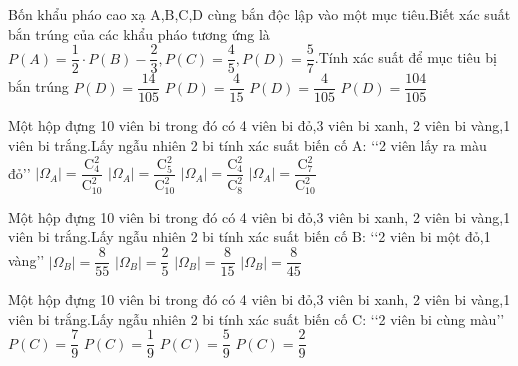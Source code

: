 \begin{ex}
Bốn khẩu pháo cao xạ A,B,C,D cùng bắn độc lập vào một mục tiêu.Biết xác suất bắn trúng của các khẩu pháo tương ứng là $P(A)=\dfrac{1}{2}\cdot P(B)-\dfrac{2}{3},P(C)=\dfrac{4}{5},P(D)=\dfrac{5}{7}$.Tính xác suất để mục tiêu bị bắn trúng
\choice
{$P(D)=\dfrac{14}{105}$}
{$P(D)=\dfrac{4}{15}$}
{$P(D)=\dfrac{4}{105}$}
{\True $P(D)=\dfrac{104}{105}$}
\end{ex}
\begin{ex}
Một hộp đựng 10 viên bi trong đó có 4 viên bi đỏ,3 viên bi xanh, 2 viên bi vàng,1 viên bi trắng.Lấy ngẫu nhiên 2 bi tính xác suất biến cố A: \lq\lq 2 viên lấy ra màu đỏ\rq\rq 
\choice
{$|\Omega_A|=\dfrac{\mathrm{C}_4^2}{\mathrm{C}_{10}^2}$}
{$|\Omega_A|=\dfrac{\mathrm{C}_5^2}{\mathrm{C}_{10}^2}$}
{$|\Omega_A|=\dfrac{\mathrm{C}_4^2}{\mathrm{C}_8^2}$}
{\True $|\Omega_A|=\dfrac{\mathrm{C}_7^2}{\mathrm{C}_{10}^2}$}
\end{ex}
\begin{ex}
Một hộp đựng 10 viên bi trong đó có 4 viên bi đỏ,3 viên bi xanh, 2 viên bi vàng,1 viên bi trắng.Lấy ngẫu nhiên 2 bi tính xác suất biến cố B: \lq\lq 2 viên bi một đỏ,1 vàng\rq\rq 
\choice
{$|\Omega_B|=\dfrac{8}{55}$}
{$|\Omega_B|=\dfrac{2}{5}$}
{$|\Omega_B|=\dfrac{8}{15}$}
{\True $|\Omega_B|=\dfrac{8}{45}$}
\end{ex}
\begin{ex}
Một hộp đựng 10 viên bi trong đó có 4 viên bi đỏ,3 viên bi xanh, 2 viên bi vàng,1 viên bi trắng.Lấy ngẫu nhiên 2 bi tính xác suất biến cố C: \lq\lq 2 viên bi cùng màu\rq\rq 
\choice
{$P(C)=\dfrac{7}{9}$}
{$P(C)=\dfrac{1}{9}$}
{$P(C)=\dfrac{5}{9}$}
{\True $P(C)=\dfrac{2}{9}$}
\end{ex}
